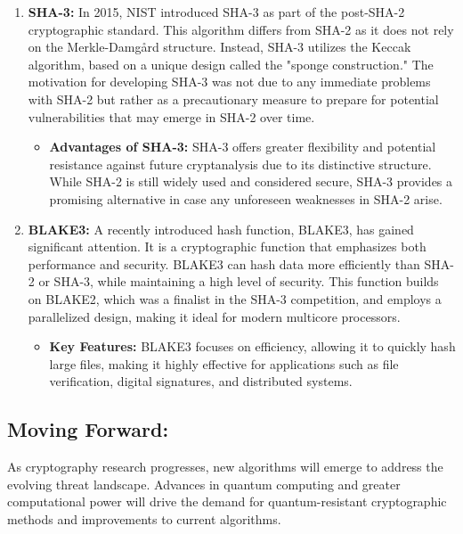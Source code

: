 \documentclass[11pt,a4paper]{article}
\begin{document}
    \begin{enumerate}
        \item \textbf{SHA-3:}
        \newline
        In 2015, NIST introduced SHA-3 as part of the post-SHA-2 cryptographic standard. This algorithm differs from SHA-2 as it does not rely on the Merkle-Damgård structure. Instead, SHA-3 utilizes the Keccak algorithm, based on a unique design called the "sponge construction." The motivation for developing SHA-3 was not due to any immediate problems with SHA-2 but rather as a precautionary measure to prepare for potential vulnerabilities that may emerge in SHA-2 over time.
            \begin{itemize}
                \item \textbf{Advantages of SHA-3:} SHA-3 offers greater flexibility and potential resistance against future cryptanalysis due to its distinctive structure. While SHA-2 is still widely used and considered secure, SHA-3 provides a promising alternative in case any unforeseen weaknesses in SHA-2 arise\cite{SHA-3-Keccak}.

            \end{itemize}

        \item \textbf{BLAKE3:}
        \newline
        A recently introduced hash function, BLAKE3, has gained significant attention. It is a cryptographic function that emphasizes both performance and security. BLAKE3 can hash data more efficiently than SHA-2 or SHA-3, while maintaining a high level of security. This function builds on BLAKE2, which was a finalist in the SHA-3 competition, and employs a parallelized design, making it ideal for modern multicore processors.
            \begin{itemize}
                \item \textbf{Key Features:} BLAKE3 focuses on efficiency, allowing it to quickly hash large files, making it highly effective for applications such as file verification, digital signatures, and distributed systems.

            \end{itemize}

    \end{enumerate}

    \subsection*{Moving Forward:}
    As cryptography research progresses, new algorithms will emerge to address the evolving threat landscape. Advances in quantum computing and greater computational power will drive the demand for quantum-resistant cryptographic methods and improvements to current algorithms.
\end{document}
